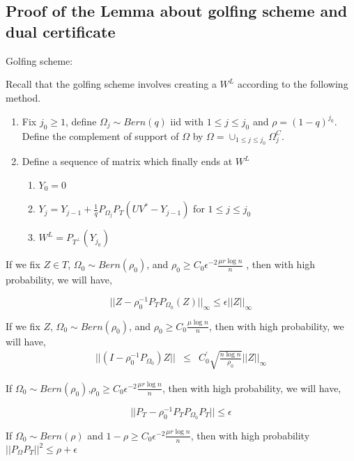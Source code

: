 \documentclass{../common/projectreport}
\begin{document}
\subsection{Proof of the Lemma about golfing scheme and dual certificate }

Golfing scheme:

Recall that the golfing scheme involves creating a $W^{L}$ according to the following method. 
\begin{enumerate}
\item Fix $j_{0}\ge1$, define $\Omega_{j}\sim Bern(q)$ iid with $1\le j\le j_{0}$ and $\rho=(1-q)^{j_{0}}$. Define the complement of support of $\Omega$ by $\Omega=\cup_{1\le j\le j_{0}}\Omega_{j}^{C}$. 
\item Define a sequence of matrix which finally ends at $W^{L}$

\begin{enumerate}
\item $Y_{0}=0$
\item $Y_{j}=Y_{j-1}+\frac{1}{q}P_{\Omega_{j}}P_{T}(UV^{*}-Y_{j-1})$ for $1\le j\le j_{0}$
\item $W^{L}=P_{\ensuremath{T^{\bot}}}(Y_{j_{0}})$
\end{enumerate}

\end{enumerate}


\begin{fact}
\label{fact2}
If we fix $Z\in T$, $\Omega_{0}\sim Bern(\rho_{0})$, and $\rho_{0}\ge C_{0}\epsilon^{-2}\frac{\mu r\log n}{n}$ , then with high probability, we will have, 

\label{fact5}
\[
||Z-\rho_{0}^{-1}P_{T}P_{\Omega_{0}}(Z)||_{\infty}\le\epsilon||Z||_{\infty}
\]

\begin{fact}
\label{fact3}
If we fix $Z$, $\Omega_{0}\sim Bern(\rho_{0})$, and $\rho_{0}\ge C_{0}\frac{\mu\log n}{n}$, then with high probability,
we will have, 
\begin{eqnarray*}
||(I-\rho_{0}^{-1}P_{\Omega_{0}})Z|| & \le & C_{0}^{'}\sqrt{\frac{n\log n}{\rho_{0}}}||Z||_{\infty}
\end{eqnarray*}

\begin{fact}
\label{fact4}
If $\Omega_{0}\sim Bern(\rho_{0})$,$\rho_{0}\ge C_{0}\epsilon^{-2}\frac{\mu r\log n}{n}$, then with high probability, we will have, 

\[
||P_{T}-\rho_{0}^{-1}P_{T}P_{\Omega_{0}}P_{T}||\le\epsilon
\]

\begin{fact}
If $\Omega_{0}\sim Bern(\rho)$ and $1-\rho\ge C_{0}\epsilon^{-2}\frac{\mu r\log n}{n}$, then with high probability $||P_{\Omega}P_{T}||^{2}\le\rho+\epsilon$ 
\end{fact}
\end{fact}
\end{fact}
\end{fact}
\end{document}
